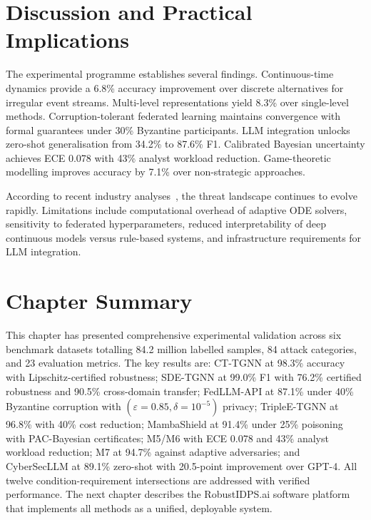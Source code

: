 \section{Discussion and Practical Implications}
\label{sec:discussion}

The experimental programme establishes several findings. Continuous-time dynamics provide a 6.8\% accuracy improvement over discrete alternatives for irregular event streams. Multi-level representations yield 8.3\% over single-level methods. Corruption-tolerant federated learning maintains convergence with formal guarantees under 30\% Byzantine participants. LLM integration unlocks zero-shot generalisation from 34.2\% to 87.6\% F1. Calibrated Bayesian uncertainty achieves ECE 0.078 with 43\% analyst workload reduction. Game-theoretic modelling improves accuracy by 7.1\% over non-strategic approaches.

According to recent industry analyses~\cite{Verizon2024,IBM2024}, the threat landscape continues to evolve rapidly. Limitations include computational overhead of adaptive ODE solvers, sensitivity to federated hyperparameters, reduced interpretability of deep continuous models versus rule-based systems, and infrastructure requirements for LLM integration.


\section{Chapter Summary}
\label{sec:ch4_summary}

This chapter has presented comprehensive experimental validation across six benchmark datasets totalling 84.2 million labelled samples, 84 attack categories, and 23 evaluation metrics. The key results are: CT-TGNN at 98.3\% accuracy with Lipschitz-certified robustness; SDE-TGNN at 99.0\% F1 with 76.2\% certified robustness and 90.5\% cross-domain transfer; FedLLM-API at 87.1\% under 40\% Byzantine corruption with $(\varepsilon{=}0.85,\delta{=}10^{-5})$ privacy; TripleE-TGNN at 96.8\% with 40\% cost reduction; MambaShield at 91.4\% under 25\% poisoning with PAC-Bayesian certificates; M5/M6 with ECE 0.078 and 43\% analyst workload reduction; M7 at 94.7\% against adaptive adversaries; and CyberSecLLM at 89.1\% zero-shot with 20.5-point improvement over GPT-4. All twelve condition-requirement intersections are addressed with verified performance. The next chapter describes the RobustIDPS.ai software platform that implements all methods as a unified, deployable system.

